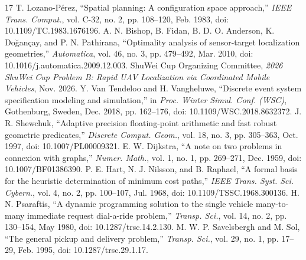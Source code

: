 \documentclass[12pt,a4paper]{article}
\makeatletter
\renewcommand{\section}{\@startsection{section}{1}{\z@}
  {-2.3ex plus -.4ex minus -.2ex}{.9ex plus .2ex}{\normalfont\normalsize\bfseries}}
\makeatother
\begin{document}
\clearpage
\begingroup
\let\OriginalSection\section
\def\section*#1{\OriginalSection*{#1}\addcontentsline{toc}{section}{References}}
\setlength{\parskip}{0pt}
\linespread{0.92}\selectfont
\begin{thebibliography}{17}
\setlength{\itemsep}{0pt}
\setlength{\parsep}{0pt}
 T. Lozano-P\'{e}rez, ``Spatial planning: A configuration space approach,'' \emph{IEEE Trans. Comput.}, vol. C-32, no. 2, pp. 108--120, Feb. 1983, doi: 10.1109/TC.1983.1676196.
 A. N. Bishop, B. Fidan, B. D. O. Anderson, K. Do\u{g}an\c{c}ay, and P. N. Pathirana, ``Optimality analysis of sensor-target localization geometries,'' \emph{Automatica}, vol. 46, no. 3, pp. 479--492, Mar. 2010, doi: 10.1016/j.automatica.2009.12.003.
 ShuWei Cup Organizing Committee, \emph{2026 ShuWei Cup Problem B: Rapid UAV Localization via Coordinated Mobile Vehicles}, Nov. 2026.
 Y. Van Tendeloo and H. Vangheluwe, ``Discrete event system specification modeling and simulation,'' in \emph{Proc. Winter Simul. Conf. (WSC)}, Gothenburg, Sweden, Dec. 2018, pp. 162--176, doi: 10.1109/WSC.2018.8632372.
 J. R. Shewchuk, ``Adaptive precision floating-point arithmetic and fast robust geometric predicates,'' \emph{Discrete Comput. Geom.}, vol. 18, no. 3, pp. 305--363, Oct. 1997, doi: 10.1007/PL00009321.
 E. W. Dijkstra, ``A note on two problems in connexion with graphs,'' \emph{Numer. Math.}, vol. 1, no. 1, pp. 269--271, Dec. 1959, doi: 10.1007/BF01386390.
 P. E. Hart, N. J. Nilsson, and B. Raphael, ``A formal basis for the heuristic determination of minimum cost paths,'' \emph{IEEE Trans. Syst. Sci. Cybern.}, vol. 4, no. 2, pp. 100--107, Jul. 1968, doi: 10.1109/TSSC.1968.300136.
 H. N. Psaraftis, ``A dynamic programming solution to the single vehicle many-to-many immediate request dial-a-ride problem,'' \emph{Transp. Sci.}, vol. 14, no. 2, pp. 130--154, May 1980, doi: 10.1287/trsc.14.2.130.
 M. W. P. Savelsbergh and M. Sol, ``The general pickup and delivery problem,'' \emph{Transp. Sci.}, vol. 29, no. 1, pp. 17--29, Feb. 1995, doi: 10.1287/trsc.29.1.17.

\end{thebibliography}
\end{document}
